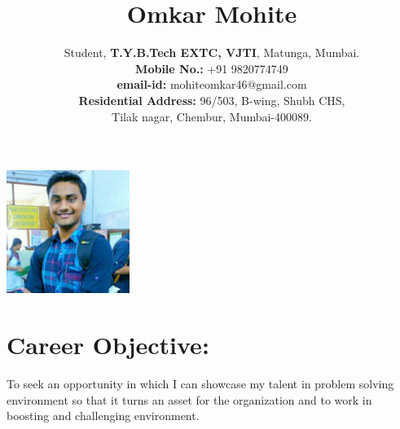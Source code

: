 \documentclass[a4 paper,12pt]{article}
\title{\bfseries\Huge Omkar Mohite}
\author{Student, \textbf{T.Y.B.Tech EXTC, VJTI}, Matunga, Mumbai.\\\textbf{Mobile No.:} +91 9820774749\\\textbf{email-id:} mohiteomkar46@gmail.com\\\textbf{Residential Address:} 96/503, B-wing, Shubh CHS,\\ Tilak nagar, Chembur, Mumbai-400089.\\}
\date{}
\begin{document}
	\begin{minipage}{0.75\textwidth}
		\begingroup
		\let\endcenter\endflushleft
		\maketitle
		\endgroup
	\end{minipage}
	\begin{minipage}{0.2\textwidth}
		\graphicspath{ {images/} }
		\includegraphics[width=4cm, height=4cm]{IMG-20140509-WA0002}
	\end{minipage}


\begin{minipage}{0.98\textwidth}
	\section{Career Objective:}
	\vspace{-0.1in}
	To seek an opportunity in which I can showcase my talent in problem solving environment so that it turns an asset for the organization and to work in boosting and challenging environment.\\\\
\end{minipage}
\end{document}

